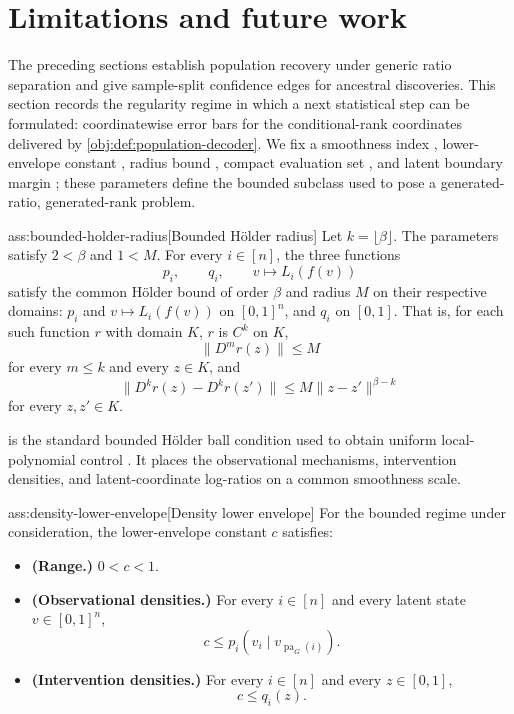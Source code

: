 \section{Limitations and future work}\label{sec:limitations}

The preceding sections establish population recovery under generic ratio separation and give sample-split confidence edges for ancestral discoveries. This section records the regularity regime in which a next statistical step can be formulated: coordinatewise error bars for the conditional-rank coordinates delivered by \cref{obj:def:population-decoder}. We fix a smoothness index , lower-envelope constant , radius bound , compact evaluation set , and latent boundary margin ; these parameters define the bounded subclass used to pose a generated-ratio, generated-rank problem.

\begin{assumptionv}{ass:bounded-holder-radius}[Bounded Hölder radius]
Let \(k=\lfloor \beta\rfloor\). The parameters satisfy \(2<\beta\) and \(1<M\). For every \(i\in[n]\), the three functions
\[
p_i,\qquad q_i,\qquad v\mapsto L_i(f(v))
\]
satisfy the common Hölder bound of order \(\beta\) and radius \(M\) on their respective domains: \(p_i\) and \(v\mapsto L_i(f(v))\) on \([0,1]^n\), and \(q_i\) on \([0,1]\). That is, for each such function \(r\) with domain \(K\), \(r\) is \(C^k\) on \(K\),
\[
\|D^m r(z)\|\le M
\]
for every \(m\le k\) and every \(z\in K\), and
\[
\|D^k r(z)-D^k r(z')\|\le M\|z-z'\|^{\beta-k}
\]
for every \(z,z'\in K\).
\end{assumptionv}

 is the standard bounded Hölder ball condition used to obtain uniform local-polynomial control \citep{Xie2023UniformConditionalCDF}. It places the observational mechanisms, intervention densities, and latent-coordinate log-ratios on a common smoothness scale.

\begin{assumptionv}{ass:density-lower-envelope}[Density lower envelope]
For the bounded regime under consideration, the lower-envelope constant \(c\) satisfies:
\begin{itemize}
\item \textbf{(Range.)} \(0<c<1\).
\item \textbf{(Observational densities.)} For every \(i\in[n]\) and every latent state \(v\in[0,1]^n\),
\[
c\le p_i(v_i\mid v_{\operatorname{pa}_G(i)}).
\]
\item \textbf{(Intervention densities.)} For every \(i\in[n]\) and every \(z\in[0,1]\),
\[
c\le q_i(z).
\]
\end{itemize}
\end{assumptionv}

